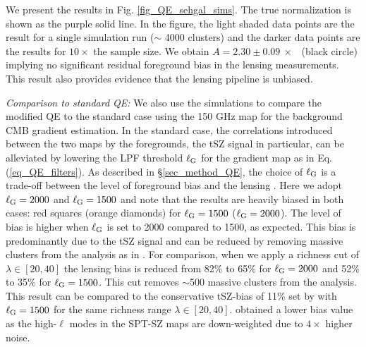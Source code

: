 We present the results in Fig. \ref{fig_QE_sehgal_sims}.
The true normalization is shown as the purple solid line.
In the figure, the light shaded data points are the result for a single simulation run ($\sim$ 4000 clusters) and the darker data points are the results for $10\times$ the sample size. 
We obtain \mbox{$A = 2.30 \pm 0.09\ \times$ \munits} (black circle) implying no significant residual foreground bias in the lensing measurements.
This result also provides evidence that the lensing pipeline is unbiased.

{\it Comparison to standard QE:} We also use the \cite{sehgal10} simulations to compare the modified QE to the standard case using the 150 GHz map for the background CMB gradient estimation.
In the standard case, the correlations introduced between the two maps by the foregrounds, the tSZ signal in particular, can be alleviated by lowering the LPF threshold $\ell_{\rm G}$ for the gradient map as in Eq. (\ref{eq_QE_filters}). 
As described in \S\ref{sec_method_QE}, the choice of $\ell_{\rm G}$ is a trade-off between the level of foreground bias and the lensing \snr{}. 
Here we adopt $\ell_{\rm G} = 2000$ and $\ell_{\rm G} = 1500$ and note that the results are heavily biased in both cases: red squares (orange diamonds) for $\ell_{\rm G} = 1500$ ($\ell_{\rm G} = 2000$).
The level of bias is higher when $\ell_{\rm G}$ is set to 2000 compared to 1500, as expected.
This bias is predominantly due to the tSZ signal and can be reduced by removing massive clusters from the analysis as in \cite{baxter18}. 
For comparison, when we apply a richness cut of $\lambda \in [20, 40]$ the lensing bias is reduced from 82\% to 65\% for $\ell_{\rm G} = 2000$ and 52\% to 35\% for $\ell_{\rm G} = 1500$. 
This cut removes $\sim$500 massive clusters from the analysis.
This result can be compared to the conservative tSZ-bias of 11\% set by \cite{baxter18} with $\ell_{\rm G} = 1500$ for the same richness range $\lambda \in [20, 40]$.
\cite{baxter18} obtained a lower bias value as the high-$\ell$ modes in the SPT-SZ maps are down-weighted due to $4\times$ higher noise.

